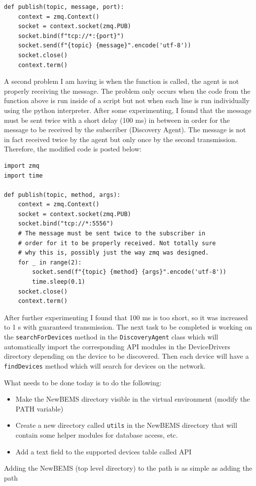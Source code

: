 \documentclass[fontsize=11pt, %
                             paper=letter, %
                             twoside, %
                             captions=tableheading,
                             index=totoc,
                             hyperref]{labbook}
\begin{document}
\begin{addmargin}[0cm]{0cm}
\begin{Verbatim}
def publish(topic, message, port):
    context = zmq.Context()
    socket = context.socket(zmq.PUB)
    socket.bind(f"tcp://*:{port}")
    socket.send(f"{topic} {message}".encode('utf-8'))
    socket.close()
    context.term()
\end{Verbatim}
A second problem I am having is when the function is called, the agent is not properly receiving the message. The problem only occurs when the code from the function above is run inside of a script but not when each line is run individually using the python interpreter.
\smallbreak\noindent
After some experimenting, I found that the message must be sent twice with a short delay (100 ms) in between in order for the message to be received by the subscriber (Discovery Agent). The message is not in fact received twice by the agent but only once by the second transmission. Therefore, the modified code is posted below:
\begin{Verbatim}
import zmq
import time

def publish(topic, method, args):
    context = zmq.Context()
    socket = context.socket(zmq.PUB)
    socket.bind("tcp://*:5556")
    # The message must be sent twice to the subscriber in
    # order for it to be properly received. Not totally sure
    # why this is, possibly just the way zmq was designed.
    for _ in range(2):
        socket.send(f"{topic} {method} {args}".encode('utf-8'))
        time.sleep(0.1)
    socket.close()
    context.term()
\end{Verbatim}
After further experimenting I found that 100 ms is too short, so it was increased to 1 s with guaranteed transmission.
\smallbreak\noindent
The next task to be completed is working on the \texttt{searchForDevices} method in the \texttt{DiscoveryAgent} class which will automatically import the corresponding API modules in the DeviceDrivers directory depending on the device to be discovered. Then each device will have a \texttt{findDevices} method which will search for devices on the network.

What needs to be done today is to do the following:
\begin{itemize}
\item Make the NewBEMS directory visible in the virtual environment (modify the PATH variable)
\item Create a new directory called \texttt{utils} in the NewBEMS directory that will contain some helper modules for database access, etc.
\item Add a text field to the supported devices table called API
\end{itemize}
Adding the NewBEMS (top level directory) to the path is as simple as adding the path


\end{addmargin}
\end{document}
